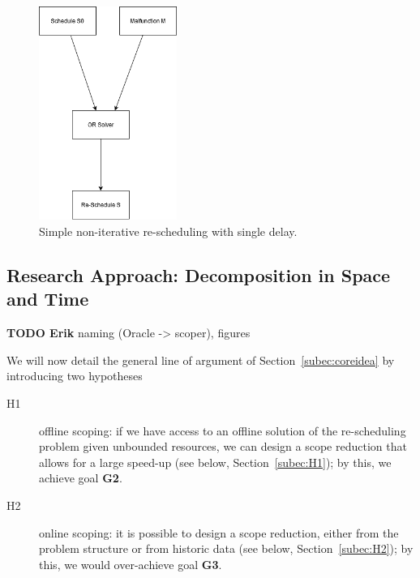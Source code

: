 \documentclass{article}
\begin{document}
%
\begin{figure}[hbtp]
	\centering
  \includegraphics[width=0.4\textwidth]{introduction_no_loop.png}
	\caption{Simple non-iterative re-scheduling with single delay.}
	\label{fig:introduction_no_loop}
\end{figure}

\subsection{Research Approach: Decomposition in Space and Time}\label{subec:scopers}

\begin{mdframed}
{\bf TODO Erik} naming (Oracle -> scoper), figures
\end{mdframed}

We will now detail the general line of argument of Section~\ref{subec:coreidea} by introducing two hypotheses 
\begin{description}
\item [H1] offline scoping: if we have access to an offline solution of the re-scheduling problem given unbounded resources, we can design a scope reduction that allows for a large speed-up (see below, Section~\ref{subec:H1}); by this, we achieve goal \textbf{G2}.
\item [H2] online scoping: it is possible to design a scope reduction, either from the problem structure or from historic data (see below, Section~\ref{subec:H2}); by this, we would over-achieve goal \textbf{G3}.
\end{description}
\end{document}
